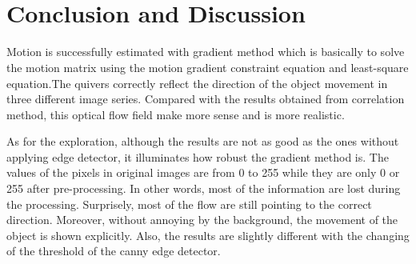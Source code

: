 \documentclass[11pt]{article}
\begin{document}
    \begin{center}
    \end{center}
    { \hspace*{\fill} \\}
    
    \begin{center}
    \end{center}
    { \hspace*{\fill} \\}
    
    \hypertarget{conclusion-and-discussion}{%
\section{Conclusion and Discussion}\label{conclusion-and-discussion}}

    Motion is successfully estimated with gradient method which is basically
to solve the motion matrix using the motion gradient constraint equation
and least-square equation.The quivers correctly reflect the direction of
the object movement in three different image series. Compared with the
results obtained from correlation method, this optical flow field make
more sense and is more realistic.

As for the exploration, although the results are not as good as the ones
without applying edge detector, it illuminates how robust the gradient
method is. The values of the pixels in original images are from 0 to 255
while they are only 0 or 255 after pre-processing. In other words, most
of the information are lost during the processing. Surprisely, most of
the flow are still pointing to the correct direction. Moreover, without
annoying by the background, the movement of the object is shown
explicitly. Also, the results are slightly different with the changing
of the threshold of the canny edge detector.


    
    
    
    
\end{document}
